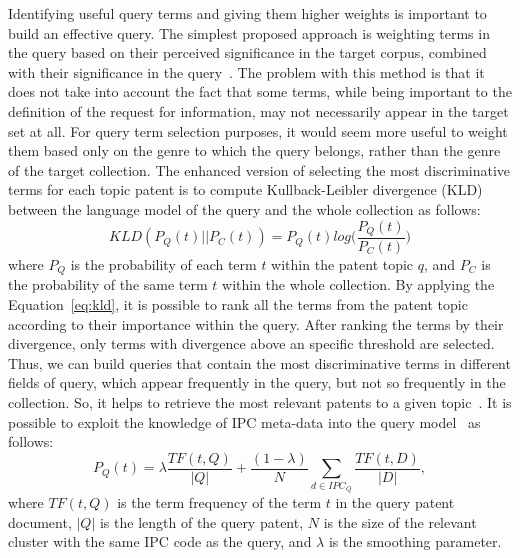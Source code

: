 Identifying useful query terms and giving them higher weights is important to build an effective query. The simplest proposed approach is weighting terms in the query based on their perceived significance in the target corpus, combined with their significance in the query~\citep{itoh2003term}. The problem with this method is that it does not take into account the fact that some terms, while being important to the definition of the request for information, may not necessarily appear in the target set at all. For query term selection purposes, it would seem more useful to weight them based only on the genre to which the query belongs, rather than the genre of the target collection. The enhanced version of selecting the most discriminative terms for each topic patent is to compute Kullback-Leibler divergence (KLD)~\citep{kullback1951information} between the language model of the query and the whole collection as follows:
\begin{equation}
\label{eq:kld}
 KLD(P_{Q}(t)||P_{C}(t)) = P_{Q}(t)log\Big(\frac{P_{Q}(t)}{P_{C}(t)}\Big)  
\end{equation}
where $ P_{Q} $ is the probability of each term $ t $ within the patent topic $ q $, and $ P_{C} $ is the probability of the same term $ t $ within the whole collection. 
By applying the Equation~\ref{eq:kld}, it is possible to rank all the terms from the patent topic according to their importance within the query. After ranking the terms by their divergence, only terms with divergence above an specific threshold are selected. Thus, we can build queries that contain the most discriminative terms in different fields of query, which appear frequently in the query, but not so frequently in the collection. So, it helps to retrieve the most relevant patents to a given topic~\citep{perez2010using}. It is possible to exploit the knowledge of IPC meta-data into the query model~\citep{mahdabi2011building} as follows:
\begin{equation}
\label{eq:IPCmodel}
 P_{Q}(t) = \lambda\frac{TF(t,Q)}{|Q|}+\frac{(1-\lambda)}{N}\sum_{d\in IPC_{Q}}\frac{TF(t,D)}{|D|} , 
\end{equation}
where $ TF(t,Q) $ is the term frequency of the term $ t $ in the query patent document, $ |Q| $ is the length of the query patent, $ N $ is the size of the relevant cluster with the same IPC code as the query, and $ \lambda $ is the smoothing parameter.
